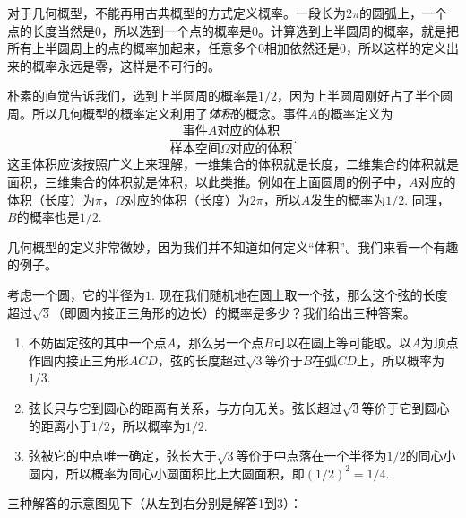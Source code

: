 对于几何概型，不能再用古典概型的方式定义概率。一段长为$2\pi$的圆弧上，一个点的长度当然是$0$，所以选到一个点的概率是$0$。计算选到上半圆周的概率，就是把所有上半圆周上的点的概率加起来，任意多个$0$相加依然还是$0$，所以这样的定义出来的概率永远是零，这样是不可行的。

朴素的直觉告诉我们，选到上半圆周的概率是$1/2$，因为上半圆周刚好占了半个圆周。所以几何概型的概率定义利用了\emph{体积}的概念。事件$A$的概率定义为
\[
    \frac{\text{事件$A$对应的体积}}{\text{样本空间$\Omega$对应的体积}}.
\]
这里体积应该按照广义上来理解，一维集合的体积就是长度，二维集合的体积就是面积，三维集合的体积就是体积，以此类推。例如在上面圆周的例子中，$A$对应的体积（长度）为$\pi$，$\Omega$对应的体积（长度）为$2\pi$，所以$A$发生的概率为$1/2$. 同理，$B$的概率也是$1/2$.

几何概型的定义非常微妙，因为我们并不知道如何定义“体积”。我们来看一个有趣的例子。

\begin{example}[Bertrand悖论]
考虑一个圆，它的半径为$1$. 现在我们随机地在圆上取一个弦，那么这个弦的长度超过$\sqrt{3}$（即圆内接正三角形的边长）的概率是多少？我们给出三种答案。
\begin{enumerate}[label=\textbf{解答\arabic*.},fullwidth,itemindent=2em]
    \item 不妨固定弦的其中一个点$A$，那么另一个点$B$可以在圆上等可能取。以$A$为顶点作圆内接正三角形$ACD$，弦的长度超过$\sqrt{3}$等价于$B$在弧$CD$上，所以概率为$1/3$.
    \item 弦长只与它到圆心的距离有关系，与方向无关。弦长超过$\sqrt{3}$等价于它到圆心的距离小于$1/2$，所以概率为$1/2$.
    \item 弦被它的中点唯一确定，弦长大于$\sqrt{3}$等价于中点落在一个半径为$1/2$的同心小圆内，所以概率为同心小圆面积比上大圆面积，即$(1/2)^2=1/4$.
\end{enumerate}
三种解答的示意图见下（从左到右分别是解答1到3）：
\begin{center}
\end{center}
\end{example}

